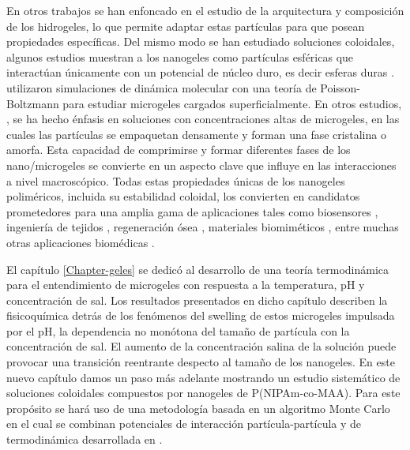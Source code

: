 	En otros trabajos \cite{scotti2022softness, urich2016swelling} se han enfoncado en el estudio de la  arquitectura y composici\'on de los hidrogeles, lo que permite adaptar estas part\'iculas para que posean propiedades espec\'ificas.
	Del mismo modo se han estudiado soluciones coloidales, algunos estudios muestran a los nanogeles como part\'iculas esf\'ericas que interact\'uan \'unicamente con un potencial de n\'ucleo duro, es decir  esferas duras \cite{karg2019nanogels}. \citet{alziyadi2023osmotic} utilizaron simulaciones de din\'amica molecular con una teor\'ia de Poisson-Boltzmann para estudiar microgeles cargados superficialmente. En otros estudios, \cite{scotti2022softness, scheffold2020pathways}, se ha hecho \'enfasis en soluciones con concentraciones altas de microgeles, en las cuales las part\'iculas se empaquetan densamente y forman una fase cristalina o amorfa. Esta capacidad de comprimirse y formar diferentes fases de los nano/microgeles se convierte en un aspecto clave que influye en las interacciones a nivel macrosc\'opico.
	Todas estas propiedades \'unicas de los nanogeles polim\'ericos, incluida su estabilidad coloidal, los convierten en candidatos prometedores para una amplia gama de aplicaciones tales como biosensores \cite{zhang2012ultrathin, islam2014responsive}, ingenier\'ia de tejidos \cite{matricardi2013interpenetrating, van2011biopolymer}, regeneraci\'on \'osea \cite{bai2018bioactive}, materiales biomim\'eticos \cite{green2016mimicking, wu2010multifunctional}, entre muchas otras aplicaciones biom\'edicas \cite{Daly2020}.
	
	El cap\'itulo \ref{Chapter-geles} se dedic\'o al desarrollo de una teor\'ia termodin\'amica para el entendimiento de microgeles con respuesta a la temperatura, pH y concentraci\'on de sal. Los resultados presentados en dicho cap\'itulo describen la fisicoqu\'imica detr\'as de los fen\'omenos del swelling de estos microgeles impulsada por el pH, la dependencia no mon\'otona del tama\~no de part\'icula con la concentraci\'on de sal. El aumento de la concentraci\'on salina de la soluci\'on puede provocar una transici\'on reentrante despecto al tama\~no de los nanogeles.
	En este nuevo cap\'itulo damos un paso m\'as adelante mostrando un estudio sistem\'atico de soluciones coloidales compuestos por nanogeles de P(NIPAm-co-MAA). Para este prop\'osito se har\'a uso de una metodolog\'ia basada en un algoritmo Monte Carlo en el cual se combinan potenciales de interacci\'on part\'icula-part\'icula y de termodin\'amica desarrollada en \cite{perez2021thermodynamic}. 
	
